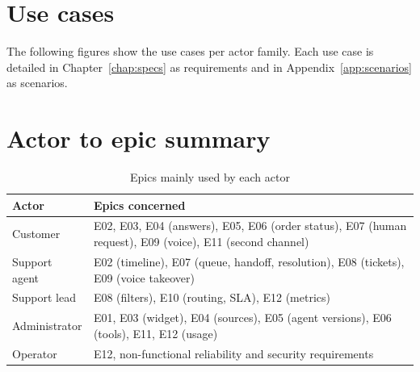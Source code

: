 \section{Use cases}
The following figures show the use cases per actor family. Each use case is detailed in Chapter~\ref{chap:specs} as requirements and in Appendix~\ref{app:scenarios} as scenarios.


\section{Actor to epic summary}
\begin{table}[htbp]
\centering\caption{Epics mainly used by each actor}\label{tab:actor-epic}
\begin{tabular}{@{}p{4cm}p{12cm}@{}}
\toprule \textbf{Actor} & \textbf{Epics concerned} \\ \midrule
Customer & E02, E03, E04 (answers), E05, E06 (order status), E07 (human request), E09 (voice), E11 (second channel) \\
Support agent & E02 (timeline), E07 (queue, handoff, resolution), E08 (tickets), E09 (voice takeover) \\
Support lead & E08 (filters), E10 (routing, SLA), E12 (metrics) \\
Administrator & E01, E03 (widget), E04 (sources), E05 (agent versions), E06 (tools), E11, E12 (usage) \\
Operator & E12, non-functional reliability and security requirements \\
\bottomrule
\end{tabular}
\end{table}
